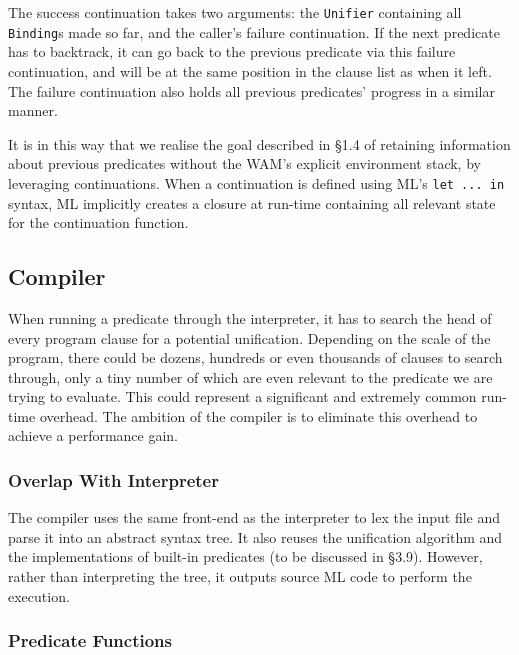 \documentclass[12pt]{article}
\begin{document}

The success continuation takes two arguments: the \verb|Unifier| containing all \verb|Binding|s made so far, and the caller's failure continuation. 
If the next predicate has to backtrack, it can go back to the previous predicate via this failure continuation, and will be at the same position in the clause list as when it left. 
The failure continuation also holds all previous predicates' progress in a similar manner.


It is in this way that we realise the goal described in \S1.4 of retaining information about previous predicates without the WAM's explicit environment stack, by leveraging continuations. 
When a continuation is defined using ML's \verb|let ... in| syntax, ML implicitly creates a closure at run-time containing all relevant state for the continuation function.

\subsection{Compiler}

When running a predicate through the interpreter, it has to search the head of every program clause for a potential unification. 
Depending on the scale of the program, there could be dozens, hundreds or even thousands of clauses to search through, only a tiny number of which are even relevant to the predicate we are trying to evaluate.
This could represent a significant and extremely common run-time overhead. The ambition of the compiler is to eliminate this overhead to achieve a performance gain.

\subsubsection{Overlap With Interpreter}

The compiler uses the same front-end as the interpreter to lex the input file and parse it into an abstract syntax tree. 
It also reuses the unification algorithm and the implementations of built-in predicates (to be discussed in \S3.9). 
However, rather than interpreting the tree, it outputs source ML code to perform the execution.

\subsubsection{Predicate Functions}
\end{document}
